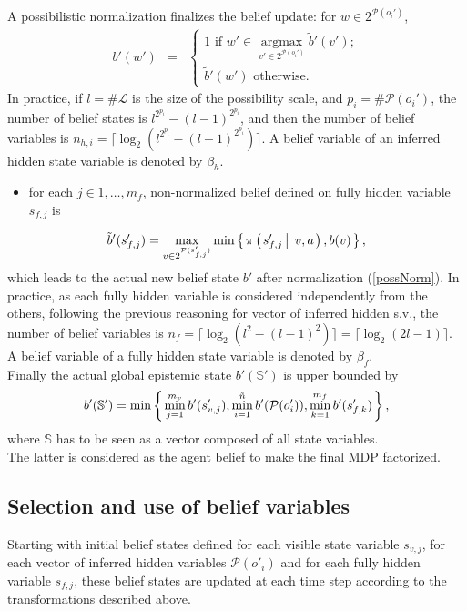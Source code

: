 A possibilistic normalization finalizes the belief update: for $w \in 2^{\mathcal{P}(o_i')}$,
\begin{eqnarray}
\label{possNorm} b'(w') & = & \left \{ \begin{array}{ccc} 1 \mbox{ if } w' \in \operatorname*{argmax}_{v' \in 2^{\mathcal{P}(o_i')}} \tilde{b}'(v'); \\
 \tilde{b}'(w') \mbox{ otherwise} . \end{array} \right.
\end{eqnarray} 
In practice, if $l=\# \mathcal{L}$ is the size of the possibility scale, and $p_i = \# \mathcal{P}(o_i')$, the number of belief states
is $l^{2^{p_i}} - (l-1)^{2^{p_i}}$, and then the number of belief variables is $n_{h,i} = \lceil \log_2(l^{2^{p_i}} - (l-1)^{2^{p_i}}) \rceil$.
A belief variable of an inferred hidden state variable is denoted by $\beta_h$.
\begin{itemize}
\item for each $j \in 1,\ldots,m_f$, non-normalized belief defined on fully hidden 
variable $s_{f,j}$ is 
\end{itemize}
\begin{equation}
\label{fullyHiddenBel}
\tilde{b}'(s_{f,j}') = \max_{v \in 2^{\mathcal{P}(s_{f,j}') }} \min \left\{ \left.  \pi \left( \left.  s_{f,j}' \, \right| \left. \, v,a \right. \right), b(v)  \right. \right\},
\end{equation}
which leads to the actual new belief state $b'$ after normalization (\ref{possNorm}).
In practice, as each fully hidden variable is considered independently from the others, 
following the previous reasoning for vector of inferred hidden s.v., 
the number of belief variables is $n_f = \lceil \log_2(l^2 - (l-1)^2) \rceil = \lceil \log_2(2l-1) \rceil$.
A belief variable of a fully hidden state variable is denoted by $\beta_f$. \\

Finally the actual global epistemic state $b'(\mathbb{S}')$ is upper bounded by 
\begin{equation}
b'(\mathbb{S}') = \min \left\{ \left.  \min_{j=1}^{m_v} b'(s'_{v,j}), \min_{i=1}^{\tilde{n}} b'(\mathcal{P}(o_i')), \min_{k=1}^{m_f} b'(s_{f,k}')  \right. \right\},
\end{equation}
where $\mathbb{S}$ has to be seen as a vector composed of all state variables.\\
The latter is considered as the agent belief
to make the final MDP factorized.

\subsection{Selection and use of belief variables}
Starting with initial belief states defined for each visible state variable $s_{v,j}$,
for each vector of inferred hidden variables $\mathcal{P}(o'_i)$ and for each fully 
hidden variable $s_{f,j}$, these belief states are updated at each time step according to the
transformations described above.

